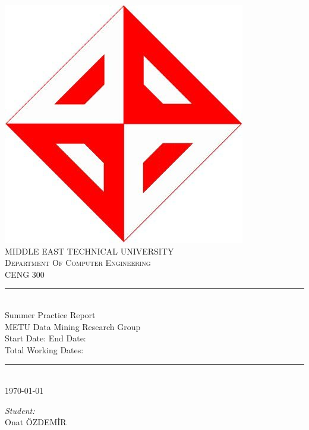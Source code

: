 \documentclass[12pt]{article}
\begin{document}
	\begin{titlepage}
		\newcommand{\HRule}{\rule{\linewidth}{0.1mm}} 
		\center 
		\includegraphics[scale=0.12]{ceng} \\
		\vspace{1cm}
		\textsc{\Large MIDDLE EAST TECHNICAL UNIVERSITY}\\[0.5cm]
		\textsc{\large Department Of Computer Engineering}\\[0.5cm]
		\textsc{\large CENG 300}\\
		\HRule \\[0.4cm]
		{ \huge \Large Summer Practice Report }\\[0.4cm]
		METU Data Mining Research Group \\
		Start Date: \hspace{25px}  End Date: \\
		Total Working Dates:
		
		\HRule \\[0.3cm]
		{\today}\\[1.2cm]
		
		
		\begin{minipage}{0.4\textwidth}
			\begin{flushleft} \large
				
				\emph{Student:}\\
				Onat ÖZDEMİR
			\end{flushleft}
			

\end{minipage}
\end{titlepage}
\end{document}
